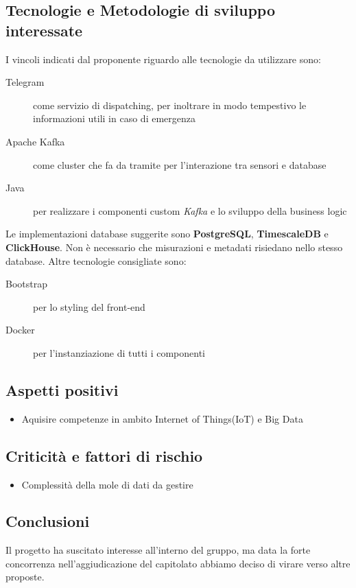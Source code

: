 \documentclass[../studio-di-fattibilita.tex]{subfiles}
\begin{document}
	\subsection{Tecnologie e Metodologie di sviluppo interessate}
	\label{subsec:tecnologie_interessate}
	I vincoli indicati dal proponente riguardo alle tecnologie da utilizzare sono:
	\begin{description}
		\item[Telegram] come servizio di dispatching, per inoltrare in modo tempestivo le informazioni utili in caso di emergenza
		\item[Apache Kafka] come cluster che fa da tramite per l'interazione tra sensori e database
		\item[Java] per realizzare i componenti custom \textit{Kafka} e lo sviluppo della business logic
	\end{description}
	Le implementazioni database suggerite sono \textbf{PostgreSQL}, \textbf{TimescaleDB} e \textbf{ClickHouse}.
	Non è necessario che misurazioni e metadati risiedano nello stesso database.
	Altre tecnologie consigliate sono:
	\begin{description}
		\item[Bootstrap] per lo styling del front-end
		\item[Docker] per l'instanziazione di tutti i componenti
	\end{description}
	\subsection{Aspetti positivi}
	\label{subsec:aspetti_positivi}
	\begin{itemize}
		\item Aquisire competenze in ambito Internet of Things(IoT) e Big Data
	\end{itemize}
	\subsection{Criticità e fattori di rischio}
	\label{subsec:criticità_e_fattori_di_rischio}
	\begin{itemize}
		\item Complessità della mole di dati da gestire
	\end{itemize}
	\subsection{Conclusioni}
	\label{subsec:conclusioni}
	Il progetto ha suscitato interesse all'interno del gruppo, ma data la forte concorrenza nell'aggiudicazione del capitolato abbiamo deciso di virare verso altre proposte.
\end{document}
